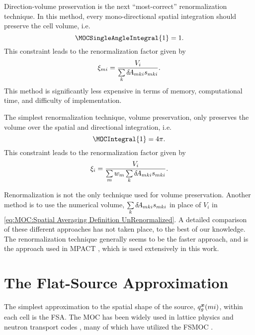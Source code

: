 {{{            Direction-volume preservation is the next ``most-correct'' renormalization technique.
            In this method, every mono-directional spatial integration should preserve the cell volume, i.e.
            \begin{equation}\label{eq:MOC:Angle-Volume Preservation}
                \MOCSingleAngleIntegral{1} = 1.
            \end{equation}
            This constraint leads to the renormalization factor given by
            \begin{equation}\label{eq:MOC:Direction-Dependent Renormalization}
                \renorm[mi] = \frac{V_i}{\suml[k]\tA[mki]\segl}.
            \end{equation}
            This method is significantly less expensive in terms of memory, computational time, and difficulty of implementation.

            The simplest renormalization technique, volume preservation, only preserves the volume over the spatial and directional integration, i.e.
            \begin{equation}\label{eq:MOC:Volume Preservation}
                \MOCIntegral{1} = \fourpi.
            \end{equation}
            This constraint leads to the renormalization factor given by
            \begin{equation}\label{eq:MOC:Region Renormalization}
                \renorm[i] = \frac{V_i}{\suml[m]\wt[m]\suml[k]\tA[mki]\segl}.
            \end{equation}

            Renormalization is not the only technique used for volume preservation.
            Another method is to use the numerical volume, $\suml[k]\tA[mki]\segl$ in place of $V_i$ in \cref{eq:MOC:Spatial Averaging Definition UnRenormalized}.
            A detailed comparison of these different approaches has not taken place, to the best of our knowledge.
            The renormalization technique generally seems to be the faster approach, and is the approach used in MPACT \cite{Collins2016}, which is used extensively in this work.
        }
    }
    \section{The Flat-Source Approximation}{\label{sec:MOC:FSA}
        The simplest approximation to the spatial shape of the source, $\source[mi][g][\loc]$, within each cell is the \acf{FSA}.
        The \ac{MOC} has been widely used in lattice physics and neutron transport codes \cite{Knott2010}, many of which have utilized the \ac{FSMOC} \cite{Halsall1980,Hong1998,Saji2000,Smith2002,Sugimura2006,Masiello2008,Boyd2014,Collins2016}.

}}

